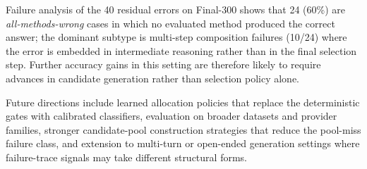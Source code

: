 Failure analysis of the 40 residual errors on Final-300 shows that 24 (60\%)
are \emph{all-methods-wrong} cases in which no evaluated method produced the
correct answer; the dominant subtype is multi-step composition failures
(10/24) where the error is embedded in intermediate reasoning rather than in
the final selection step.
Further accuracy gains in this setting are therefore likely to require
advances in candidate generation rather than selection policy alone.

Future directions include learned allocation policies that replace the
deterministic gates with calibrated classifiers, evaluation on broader
datasets and provider families, stronger candidate-pool construction
strategies that reduce the pool-miss failure class, and extension to
multi-turn or open-ended generation settings where failure-trace signals may
take different structural forms.
